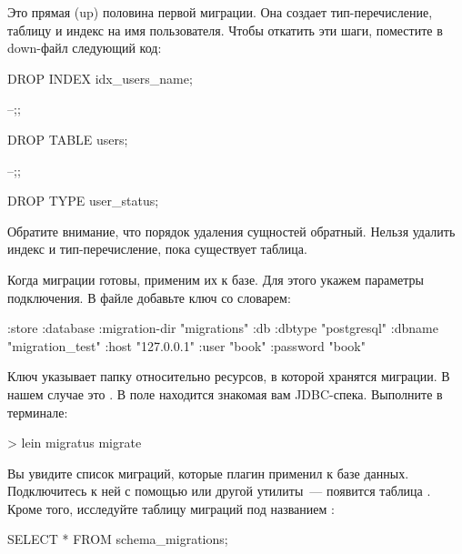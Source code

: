 Это прямая (up) половина первой миграции. Она создает тип-перечисление, таблицу  и индекс на имя пользователя. Чтобы откатить эти шаги, поместите в down-файл следующий код:

\begin{english}
  \begin{sql}
DROP INDEX idx_users_name;

--;;

DROP TABLE users;

--;;

DROP TYPE user_status;
  \end{sql}
\end{english}

Обратите внимание, что порядок удаления сущностей обратный. Нельзя удалить индекс и тип-перечисление, пока существует таблица.

Когда миграции готовы, применим их к базе. Для этого укажем параметры подключения. В файле  добавьте ключ  со словарем:

\begin{english}
  \begin{clojure}
{:store :database
 :migration-dir "migrations"
 :db {:dbtype "postgresql"
      :dbname "migration_test"
      :host "127.0.0.1"
      :user "book"
      :password "book"}}
  \end{clojure}
\end{english}

Ключ  указывает папку относительно ресурсов, в которой хранятся миграции. В нашем случае это . В поле  находится знакомая вам JDBC-спека. Выполните в терминале:

\begin{english}
  \begin{bash}
> lein migratus migrate
  \end{bash}
\end{english}

Вы увидите список миграций, которые плагин применил к базе данных. Подключитесь к ней с помощью  или другой утилиты~--- появится таблица . Кроме того, исследуйте таблицу миграций под названием :

\begin{english}
  \begin{clojure}
SELECT * FROM schema_migrations;
  \end{clojure}
\end{english}


